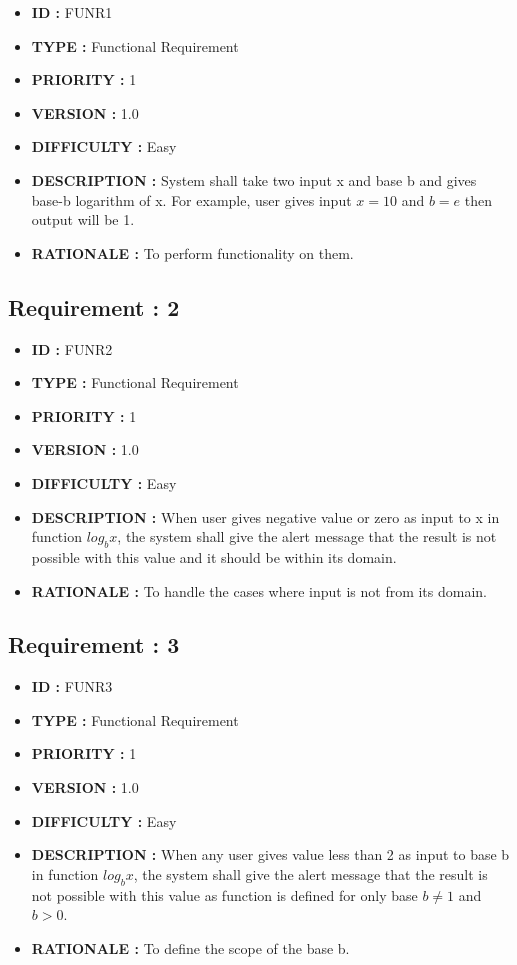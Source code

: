 \documentclass[12pt]{report}
\begin{document}
{    \begin{itemize}
      \item \textbf{ID  : } FUNR1
      \item \textbf{TYPE  : } Functional Requirement
      \item \textbf{PRIORITY  : } 1
      \item \textbf{VERSION  : } 1.0
      \item\textbf{DIFFICULTY  :} Easy
      \item \textbf{DESCRIPTION  : } System shall take two input x and base b and gives base-b logarithm of x. For example, user gives input $x= 10$ and $b = e$ then output will be 1. 
      \item\textbf{RATIONALE  : } To perform functionality on them.
      \end{itemize}
      
\subsection*{Requirement : 2}
     \begin{itemize}
      \item \textbf{ID  : } FUNR2
      \item \textbf{TYPE  : } Functional Requirement
      \item \textbf{PRIORITY  : } 1
      \item \textbf{VERSION  : } 1.0
      \item\textbf{DIFFICULTY  :} Easy
      \item \textbf{DESCRIPTION  : } When user gives negative value or zero as input to x in function $log_b x$, the system shall give the alert message that the result is not possible with this value and it should be within its domain.
      \item\textbf{RATIONALE  : } To handle the cases where input is not from its domain.
    \end{itemize}
    
\subsection*{Requirement : 3}
     \begin{itemize}
      \item \textbf{ID  : } FUNR3
      \item \textbf{TYPE  : } Functional Requirement
      \item \textbf{PRIORITY  : } 1
      \item \textbf{VERSION  : } 1.0
      \item\textbf{DIFFICULTY  :} Easy
      \item \textbf{DESCRIPTION  : } When any user gives value less than 2 as input to base b in function $log_b x$, the system shall give the alert message that the result is not possible with this value as function is defined for only base $b\neq1$ and $b>0$.
      \item\textbf{RATIONALE  : } To define the scope of the base b.
    \end{itemize}
    
}
\end{document}
